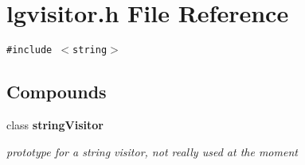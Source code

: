 \section{lgvisitor.h File Reference}
\label{lgvisitor_8h}
{\tt \#include $<$string$>$}\par
\subsection*{Compounds}
\begin{CompactItemize}
\item 
class {\bf string\-Visitor}
\begin{CompactList}\small\item\em prototype for a string visitor, not really used at the moment \item\end{CompactList}\end{CompactItemize}
